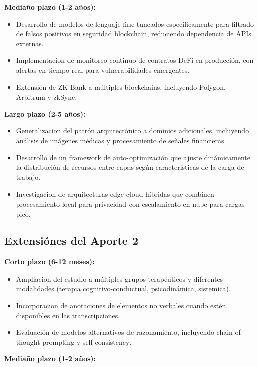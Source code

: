 \documentclass[12pt,a4paper,twoside]{book}
\begin{document}
\textbf{Mediaño plazo (1-2 años):}

\begin{itemize}
    \item Desarrollo de modelos de lenguaje fine-tuneados específicamente para filtrado de falsos positivos en seguridad blockchain, reduciendo dependencia de APIs externas.
    \item Implementacion de monitoreo continuo de contratos DeFi en producción, con alertas en tiempo real para vulnerabilidades emergentes.
    \item Extensión de ZK Bank a múltiples blockchains, incluyendo Polygon, Arbitrum y zkSync.
\end{itemize}

\textbf{Largo plazo (2-5 años):}

\begin{itemize}
    \item Generalizacion del patrón arquitectónico a dominios adicionales, incluyendo análisis de imágenes médicas y procesamiento de señales financieras.
    \item Desarrollo de un framework de auto-optimización que ajuste dinámicamente la distribución de recursos entre capas según caracteristicas de la carga de trabajo.
    \item Investigacion de arquitecturas edge-cloud híbridas que combinen procesamiento local para privacidad con escalamiento en nube para cargas pico.
\end{itemize}

\subsection{Extensiónes del Aporte 2}

\textbf{Corto plazo (6-12 meses):}

\begin{itemize}
    \item Ampliacion del estudio a múltiples grupos terapéuticos y diferentes modalidades (terapia cognitivo-conductual, psicodinámica, sistemica).
    \item Incorporacion de anotaciones de elementos no verbales cuando estén disponibles en las transcripciones.
    \item Evaluación de modelos alternativos de razonamiento, incluyendo chain-of-thought prompting y self-consistency.
\end{itemize}

\textbf{Mediaño plazo (1-2 años):}
\end{document}
